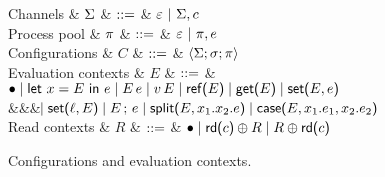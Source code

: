 \begin{figure*}
\centering
\begin{grammar}
  Channels
  & $\Sigma$ 
    & $\mathrel{::=}$ & $\varepsilon ~|~ \Sigma, c$
    \\[2mm]
  Process pool
  & $\pi$ 
    & $\mathrel{::=}$ & $\varepsilon ~|~ \pi, e$
    \\[2mm]
  Configurations
  & $C$
     & $\mathrel{::=}$ & $\left<\Sigma;\sigma;\pi\right> $
     \\[2mm]
 Evaluation contexts
  & $E$
     & $\mathrel{::=}$ & $\bullet \mathrel{\mid} \text{\textsf{let}}\ {x} = {E}\ \text{\textsf{in}}\ {e} \mathrel{\mid} E\,e \mathrel{\mid}
 v\,E \mathrel{\mid} \text{\textsf{ref}}\textsf{(}{E}\textsf{)} \mathrel{\mid} \text{\textsf{get}}\textsf{(}{E}\textsf{)} \mathrel{\mid} \text{\textsf{set}}\textsf{(}{E},{e}\textsf{)}$
     \\ &&& $\hspace{-1.02ex}\mathrel{\mid} \text{\textsf{set}}\textsf{(}{\ell},{E}\textsf{)} \mathrel{\mid} {E}\,;\,{e} \mathrel{\mid}
     \text{\textsf{split}}\textsf{(}{E},{x_1}.{x_2}.{e}\textsf{)} \mathrel{\mid} \text{\textsf{case}}\textsf{(}{E},{x_1}.{e_1},{x_2}.{e_2}\textsf{)}$
\\[2mm]
 Read contexts
  & $R$
     & $\mathrel{::=}$ & $\bullet \mathrel{\mid} \text{\textsf{rd}}\textsf{(}{c}\textsf{)} \oplus R \mathrel{\mid} R \oplus \text{\textsf{rd}}\textsf{(}{c}\textsf{)}$
\end{grammar}
\caption{Configurations and evaluation contexts.}
\label{fig:configs}
\end{figure*}

